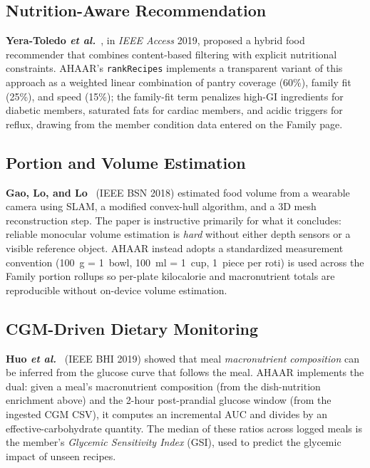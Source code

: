 \documentclass[journal]{IEEEtran}
\begin{document}
\subsection{Nutrition-Aware Recommendation}

\textbf{Yera-Toledo \emph{et al.}}~\cite{yeratoledo2019access}, in
\textit{IEEE Access} 2019, proposed a hybrid food recommender that
combines content-based filtering with explicit nutritional constraints.
AHAAR's \texttt{rankRecipes} implements a transparent variant of this
approach as a weighted linear combination of pantry coverage (60\%),
family fit (25\%), and speed (15\%); the family-fit term penalizes
high-GI ingredients for diabetic members, saturated fats for cardiac
members, and acidic triggers for reflux, drawing from the member
condition data entered on the Family page.

\subsection{Portion and Volume Estimation}

\textbf{Gao, Lo, and Lo}~\cite{gao2018bsn} (IEEE BSN 2018) estimated
food volume from a wearable camera using SLAM, a modified convex-hull
algorithm, and a 3D mesh reconstruction step. The paper is instructive
primarily for what it concludes: reliable monocular volume estimation
is \emph{hard} without either depth sensors or a visible reference
object. AHAAR instead adopts a standardized measurement
convention (100~g = 1~bowl, 100~ml = 1~cup, 1~piece per roti) is used
across the Family portion rollups so per-plate kilocalorie and
macronutrient totals are reproducible without on-device volume
estimation.

\subsection{CGM-Driven Dietary Monitoring}

\textbf{Huo \emph{et al.}}~\cite{huo2019cgm} (IEEE BHI 2019) showed
that meal \emph{macronutrient composition} can be inferred from the
glucose curve that follows the meal. AHAAR implements the dual: given
a meal's macronutrient composition (from the dish-nutrition
enrichment above) and the 2-hour post-prandial glucose window (from
the ingested CGM CSV), it computes an incremental AUC and divides by
an effective-carbohydrate quantity. The median of these ratios across
logged meals is the member's \textit{Glycemic Sensitivity Index}
(GSI), used to predict the glycemic impact of unseen recipes.
\end{document}
